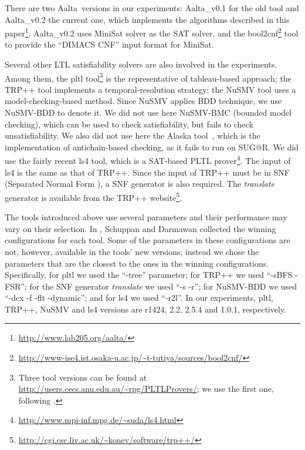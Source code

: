 \documentclass[conference]{IEEEtran}
\def\Aalta{{Aalta}}
\begin{document}
There are two \Aalta\ versions in our experiments: \Aalta\_v0.1 for
the old tool \cite{LZPVH13} and \Aalta\_v0.2 the current one, which implements 
the algorithms described in this paper\footnote{\url{http://www.lab205.org/aalta/}}.  
\Aalta\_v0.2 uses MiniSat \cite{ES03} solver as the SAT solver, and the 
bool2cnf\footnote{\url{http://www-ise4.ist.osaka-u.ac.jp/~t-tutiya/sources/bool2cnf/}}
tool to provide the ``DIMACS CNF'' input format for MiniSat. 
\iffalse
Both these tools are invoked externally. That is, \Aalta\_v0.2 provides 
the input for bool2cnf, the output of bool2cnf is the input of MiniSat, 
and then \Aalta\_v0.2 obtains Minisat's output for further processing. 
(We plan full integration when the new tool is released. These two 
tools are purely invoked and not parameters are used.  
\fi 
Several other LTL satisfiability solvers are also involved in the
experiments. Among them, the pltl tool\footnote{Three tool versions can be found at 
\url{http://users.cecs.anu.edu.au/~rpg/PLTLProvers/}; we use the first one, 
following \cite{SD11}.} 
\cite{Sch98} is the representative of tableau-based approach; 
the TRP++ tool \cite{HK03} implements a temporal-resolution strategy; 
the NuSMV tool \cite{CCGGPRST02} uses a model-checking-based method. 
Since NuSMV applies BDD technique, we use NuSMV-BDD to denote it. 
We did not use here NuSMV-BMC (bounded model checking), which can be used 
to check satisfiability, but fails to check unsatisfiability.
We also did not use here the Alaska tool~\cite{DDMR08}, which is the
implementation of antichain-based checking, as it fails to run on SUG@R. 
We did use the fairly recent ls4 tool, which is a SAT-based PLTL 
prover\cite{SW12}\footnote{\url{http://www.mpi-inf.mpg.de/~suda/ls4.html}}. 
The input of ls4 is the same as that of TRP++. 
Since the input of TRP++ must be in SNF (Separated Normal Form 
\cite{Fish97}), a SNF generator is also required. 
The \textit{translate} generator is available from the TRP++ website\footnote{\url{http://cgi.csc.liv.ac.uk/~konev/software/trp++/}}. 

The tools introduced above use several parameters and their performance may
vary on their selection.  In \cite{SD11}, Schuppan and Darmawan collected 
the winning configurations for each tool.  Some of the parameters in these 
configurations are not, however, available in the tools' new versions; 
instead we chose the parameters that are the closest to the ones in the 
winning configurations. Specifically, for pltl we used the ``-tree'' 
parameter;  for TRP++ we used ``-sBFS -FSR''; for the SNF generator 
\textit{translate} we used ``-s -r''; for NuSMV-BDD we used 
``-dcx -f -flt -dynamic''; and for ls4 we used ``-r2l''. In our experiments,
pltl, TRP++, NuSMV and ls4 versions are r1424, 2.2, 2.5.4 and 1.0.1, 
respectively. 
\end{document}
